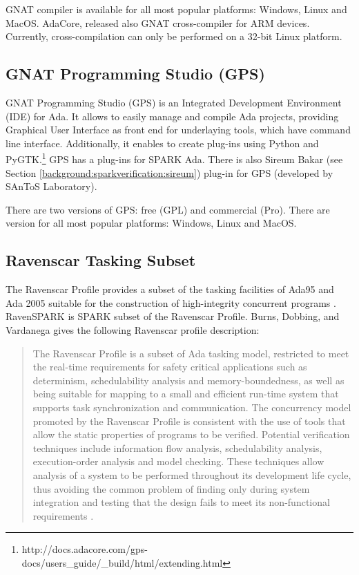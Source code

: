 GNAT compiler is available for all most popular platforms: Windows, Linux and MacOS. AdaCore, released also GNAT cross-compiler for ARM devices. Currently, cross-compilation can only be performed on a 32-bit Linux platform.



\subsection{GNAT Programming Studio (GPS)}
\label{background:spark:gps}

GNAT Programming Studio (GPS) is an Integrated Development Environment (IDE) for Ada. It allows to easily manage and compile Ada projects, providing Graphical User Interface as front end for underlaying tools, which have command line interface. Additionally, it enables to create plug-ins using Python and PyGTK.\footnote{http://docs.adacore.com/gps-docs/users\_guide/\_build/html/extending.html} GPS has a plug-ins for SPARK Ada. There is also Sireum Bakar (see Section \ref{background:sparkverification:sireum}) plug-in for GPS (developed by SAnToS Laboratory).

There are two versions of GPS: free (GPL) and commercial (Pro). There are version for all most popular platforms: Windows, Linux and MacOS.



\subsection{Ravenscar Tasking Subset}
\label{background:spark:ravenscar}

The Ravenscar Profile provides a subset of the tasking facilities of Ada95 and Ada 2005 suitable for the construction of high-integrity concurrent programs \cite{Ravenscar:Online}. RavenSPARK is SPARK subset of the Ravenscar Profile. Burns, Dobbing, and Vardanega gives the following Ravenscar profile description:
\begin{quote}
The Ravenscar Profile is a subset of Ada tasking model, restricted to meet the real-time requirements for safety critical applications such as determinism, schedulability analysis and memory-boundedness, as well as being suitable for mapping to a small and efficient run-time system that supports task synchronization and communication. The concurrency model promoted by the Ravenscar Profile is consistent with the use of tools that allow the static properties of programs to be verified. Potential verification techniques include information flow analysis, schedulability analysis, execution-order analysis and model checking. These techniques allow analysis of a system to be performed throughout its development life cycle, thus avoiding the common problem of finding only during system integration and testing that the design fails to meet its non-functional requirements \cite{Ravenscar:Article}. 
\end{quote}

